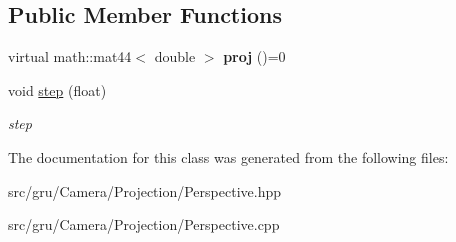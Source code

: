 \subsection*{\-Public \-Member \-Functions}
\begin{DoxyCompactItemize}
\item 
\hypertarget{classglutpp_1_1Camera_1_1Projection_1_1Perspective_a4d46649214b573fedd251cd7d7e5ba4d}{virtual math\-::mat44$<$ double $>$ {\bfseries proj} ()=0}\label{classglutpp_1_1Camera_1_1Projection_1_1Perspective_a4d46649214b573fedd251cd7d7e5ba4d}

\item 
\hypertarget{classglutpp_1_1Camera_1_1Projection_1_1Perspective_a0ddb1d4c5039ca1e58f3d89680d7bcf7}{void \hyperlink{classglutpp_1_1Camera_1_1Projection_1_1Perspective_a0ddb1d4c5039ca1e58f3d89680d7bcf7}{step} (float)}\label{classglutpp_1_1Camera_1_1Projection_1_1Perspective_a0ddb1d4c5039ca1e58f3d89680d7bcf7}

\begin{DoxyCompactList}\small\item\em step \end{DoxyCompactList}\end{DoxyCompactItemize}


\-The documentation for this class was generated from the following files\-:\begin{DoxyCompactItemize}
\item 
src/gru/\-Camera/\-Projection/\-Perspective.\-hpp\item 
src/gru/\-Camera/\-Projection/\-Perspective.\-cpp\end{DoxyCompactItemize}
